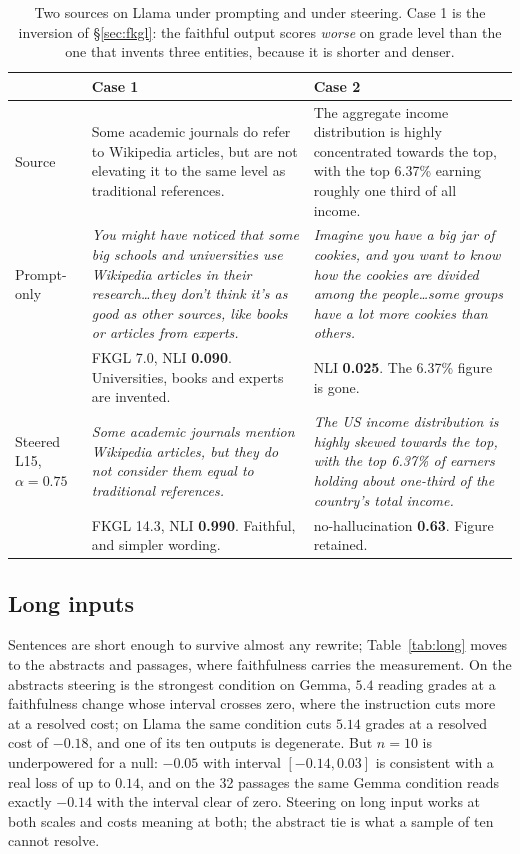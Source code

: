 \documentclass[aps,prb,reprint,nofootinbib,a4paper]{revtex4-2}
\begin{document}
\begin{table}[t]
\centering
\small
\caption{Two sources on Llama under prompting and under steering.
Case 1 is the inversion of \S\ref{sec:fkgl}: the faithful output scores
\emph{worse} on grade level than the one that invents three entities, because
it is shorter and denser.}
\begin{tabular}{@{}p{1.9cm}p{6.3cm}p{6.3cm}@{}}
\toprule
& Case 1 & Case 2 \\
\midrule
Source &
Some academic journals do refer to Wikipedia articles, but are not elevating it
to the same level as traditional references. &
The aggregate income distribution is highly concentrated towards the top, with
the top 6.37\% earning roughly one third of all income. \\
\addlinespace
Prompt-only &
\emph{You might have noticed that some big schools and universities use Wikipedia
articles in their research\dots they don't think it's as good as other sources,
like books or articles from experts.} &
\emph{Imagine you have a big jar of cookies, and you want to know how the cookies
are divided among the people\dots some groups have a lot more cookies than
others.} \\
& FKGL 7.0, NLI \textbf{0.090}. Universities, books and experts are invented. &
NLI \textbf{0.025}. The 6.37\% figure is gone. \\
\addlinespace
Steered L15, $\alpha{=}0.75$ &
\emph{Some academic journals mention Wikipedia articles, but they do not consider
them equal to traditional references.} &
\emph{The US income distribution is highly skewed towards the top, with the top
6.37\% of earners holding about one-third of the country's total income.} \\
& FKGL 14.3, NLI \textbf{0.990}. Faithful, and simpler wording. &
no-hallucination \textbf{0.63}. Figure retained. \\
\bottomrule
\end{tabular}
\label{tab:qual}
\end{table}

\subsection{Long inputs}
\label{sec:long}

Sentences are short enough to survive almost any rewrite; Table~\ref{tab:long}
moves to the abstracts and passages, where faithfulness carries the
measurement. On the abstracts steering is the strongest condition on Gemma,
$5.4$ reading grades at a faithfulness change whose interval crosses zero,
where the instruction cuts more at a resolved cost; on Llama the same
condition cuts $5.14$ grades at a resolved cost of $-0.18$, and one of its ten
outputs is degenerate. But $n=10$ is underpowered for a null: $-0.05$ with
interval $[-0.14, 0.03]$ is consistent with a real loss of up to $0.14$, and
on the 32 passages the same Gemma condition reads exactly $-0.14$ with the
interval clear of zero. Steering on long input works at both scales and costs
meaning at both; the abstract tie is what a sample of ten cannot resolve.
\end{document}
